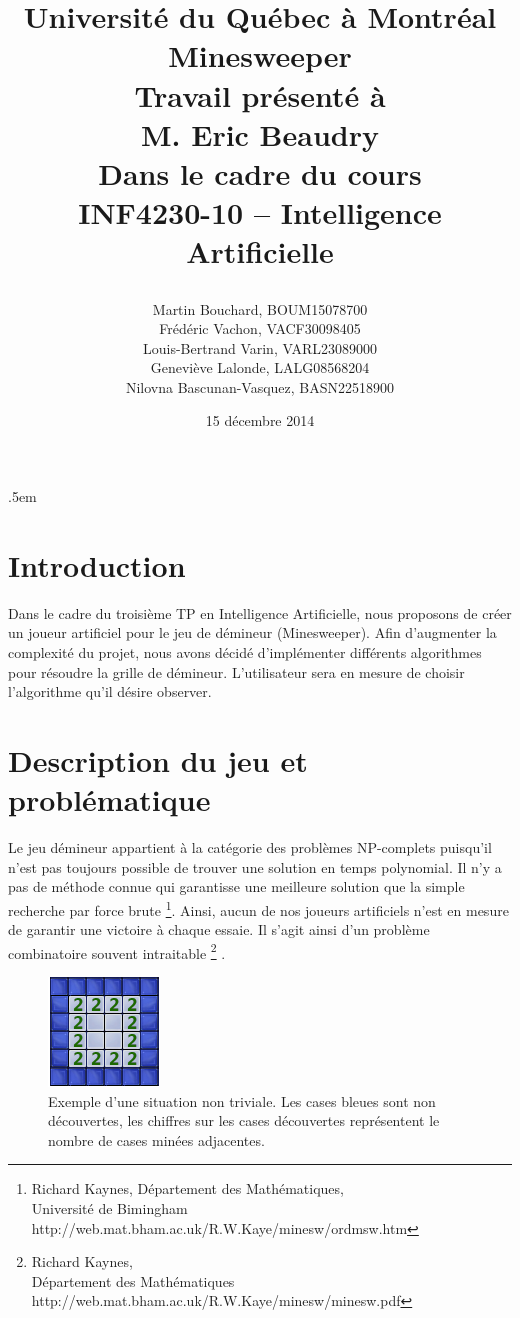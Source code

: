 \documentclass{article}
\title{%
\Large{Université du Québec à Montréal}\\
\vspace{2.5cm}
\Huge{Minesweeper}\\
\vspace{3cm}
\Large{Travail présenté à \\M. Eric Beaudry} \\
\vspace{2cm}
\Large{Dans le cadre du cours \\INF4230-10 – Intelligence Artificielle}
\author{Martin Bouchard, BOUM15078700\\Frédéric Vachon, VACF30098405\\Louis-Bertrand Varin,
VARL23089000\\Geneviève Lalonde, LALG08568204\\Nilovna Bascunan-Vasquez, BASN22518900}
\date{\vspace{2cm} 15 décembre 2014}
\vfill
}
\begin{document}
\maketitle

\thispagestyle{empty}
\clearpage

\openup .5em

\section{Introduction}
Dans le cadre du troisième TP en Intelligence Artificielle, nous proposons de créer 
un joueur artificiel pour le jeu de démineur (Minesweeper). Afin d’augmenter la complexité 
du projet, nous avons décidé d’implémenter différents algorithmes pour résoudre la 
grille de démineur. L’utilisateur sera en mesure de choisir l’algorithme qu’il désire observer. 

\section{Description du jeu et problématique}
Le jeu démineur appartient à la catégorie des problèmes NP-complets puisqu’il n’est 
pas toujours possible de trouver une solution en temps polynomial. Il n’y a pas de 
méthode connue qui garantisse une meilleure solution que la simple recherche par force 
brute \footnote{Richard Kaynes, Département des Mathématiques, \\ Université de Bimingham http://web.mat.bham.ac.uk/R.W.Kaye/minesw/ordmsw.htm}. 
Ainsi, aucun de nos joueurs artificiels n'est en mesure de garantir une victoire à chaque essaie.
Il s’agit ainsi d’un problème combinatoire souvent intraitable
\footnote{Richard Kaynes, \\ Département des Mathématiques http://web.mat.bham.ac.uk/R.W.Kaye/minesw/minesw.pdf} .

\begin{figure}[h!]
  \caption {Exemple d'une situation non triviale. Les cases bleues sont non découvertes, les chiffres sur les cases découvertes
  représentent le nombre de cases minées adjacentes.}
  \centering
  \includegraphics[scale=.5]{./demineur_1.png}
\end{figure}
\end{document}
